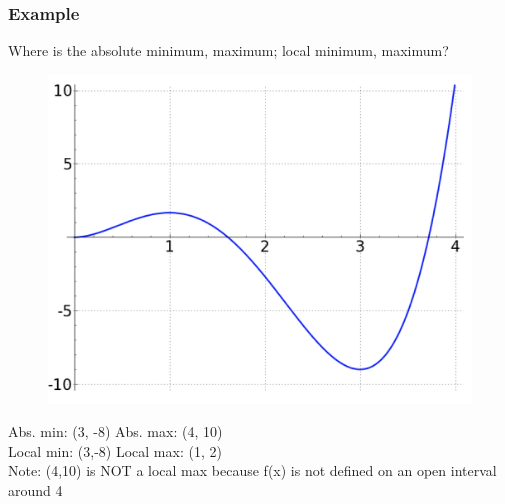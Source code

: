 \documentclass[t]{beamer}
\theoremstyle{plain}
\theoremstyle{definition}
\begin{document}
\begin{frame}

\frametitle{Example}

Where is the absolute minimum, maximum;  local minimum, maximum?

\begin{figure}[t]
\begin{center}
\includegraphics[scale=0.25]{fig/maxima}
\end{center}
\end{figure}

Abs. min: (3, -8)
Abs. max: (4, 10)\\
Local min: (3,-8)
Local max: (1, 2)\\
Note: (4,10) is NOT a local max because f(x) is not defined on an open interval around 4

\end{frame}
\end{document}
